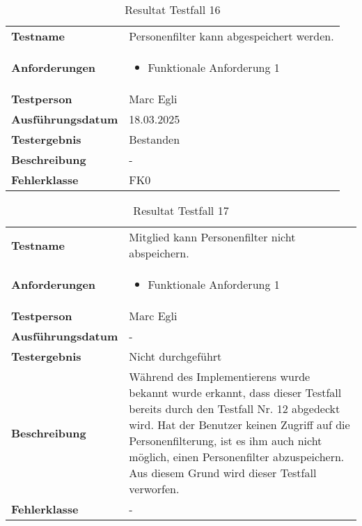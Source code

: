 \begin{table}[H]
    \begin{tabular}{|L{0.3\textwidth}|L{0.65\textwidth}|}
        \hline
           \\[10pt]
        \hline
        \textbf{Testname} & Personenfilter kann abgespeichert werden. \\
        \hline
        \textbf{Anforderungen} & 
        \begin{itemize}
            \item Funktionale Anforderung 1
        \end{itemize} \\
        \hline
        \textbf{Testperson} & Marc Egli \\
        \hline
        \textbf{Ausführungsdatum} & 18.03.2025 \\
        \hline
        \textbf{Testergebnis} & Bestanden \\
        \hline
        \textbf{Beschreibung} & - \\ 
        \hline
        \textbf{Fehlerklasse} & FK0 \\ 
        \hline
    \end{tabular}
    \caption{Resultat Testfall 16}
\end{table}

\begin{table}[H]
    \begin{tabular}{|L{0.3\textwidth}|L{0.65\textwidth}|}
        \hline
           \\[10pt]
        \hline
        \textbf{Testname} & Mitglied kann Personenfilter nicht abspeichern. \\
        \hline
        \textbf{Anforderungen} & 
        \begin{itemize}
            \item Funktionale Anforderung 1
        \end{itemize} \\
        \hline
        \textbf{Testperson} & Marc Egli \\
        \hline
        \textbf{Ausführungsdatum} & - \\
        \hline
        \textbf{Testergebnis} & Nicht durchgeführt \\
        \hline
        \textbf{Beschreibung} & Während des Implementierens wurde bekannt wurde erkannt, dass dieser Testfall bereits
        durch den Testfall Nr. 12 abgedeckt wird. Hat der Benutzer keinen Zugriff auf die Personenfilterung, ist es ihm auch nicht möglich,
        einen Personenfilter abzuspeichern. Aus diesem Grund wird dieser Testfall verworfen. \\ 
        \hline
        \textbf{Fehlerklasse} & - \\ 
        \hline
    \end{tabular}
    \caption{Resultat Testfall 17}
\end{table}


